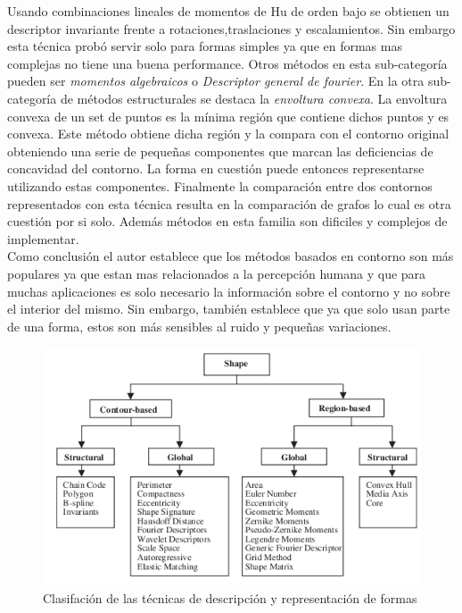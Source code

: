 Usando combinaciones lineales de momentos de Hu de orden bajo se obtienen un descriptor 
invariante frente a rotaciones,traslaciones y escalamientos. Sin embargo esta técnica probó servir solo 
para formas simples ya que en formas mas complejas no tiene una buena performance. Otros métodos en esta
sub-categoría pueden ser \textit{momentos algebraicos} o \textit{Descriptor general de fourier}. En la otra sub-categoría de métodos
estructurales se destaca la \textit{envoltura convexa}. La envoltura convexa de un set de puntos es la mínima región que contiene 
dichos puntos y es convexa. Este método obtiene dicha región y la compara con el contorno original obteniendo una serie de pequeñas
componentes que marcan las deficiencias de concavidad del contorno. La forma en cuestión puede entonces representarse utilizando estas componentes.
Finalmente la comparación entre dos contornos representados con esta técnica resulta en la comparación de grafos lo cual es otra
cuestión por si solo. Además métodos en esta familia son dificiles y complejos de implementar.\\
\indent Como conclusión el autor establece que los métodos basados en contorno son más populares ya que estan mas relacionados
a la percepción humana y que para muchas aplicaciones es solo necesario la información sobre el contorno y no sobre el interior del mismo.
Sin embargo, también establece que ya que solo usan parte de una forma, estos son más sensibles al ruido y pequeñas variaciones.

\begin{figure}[tpb]
\begin{center}
  \includegraphics[scale=0.55]{figuras/shapess.png}
\end{center}
  \caption{Clasifación de las técnicas de descripción y representación de formas}
  \label{fig:review_shape}
\end{figure}


